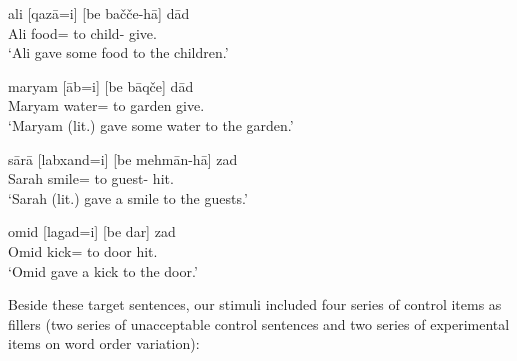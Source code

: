 \documentclass[output=paper]{langsci/langscibook}
\begin{document}
\begin{exe}
	\ex\label{qaza-exp2}
	\gll ali [qaz\=a=i] [be ba\v{c}\v{c}e-h\=a]    d\=ad\\
	Ali food= to child-  give.\\
	\glt	`Ali gave some food to the children.'
	
	\ex\label{ab-exp2}
	\gll maryam   [\=ab=i] [be b\=aq\v{c}e] d\=ad\\
	Maryam  water= to garden give.\\
	\glt	`Maryam (lit.) gave some water to the garden.'

	\ex\label{slm-exp2}
	\gll s\=ar\=a  [labxand=i] [be mehm\=an-h\=a]  zad\\
	Sarah smile= to guest-  hit.\\
	\glt	`Sarah (lit.) gave a smile to the guests.'

	\ex\label{lgd-exp2}
	\gll omid [lagad=i] [be dar] zad\\
	Omid  kick= to door hit.\\
	\glt	`Omid  gave a kick to the door.'
\end{exe}

Beside these target sentences, our stimuli included four series of control items as fillers (two series of unacceptable control sentences and two series of experimental items on word order variation):
\end{document}
